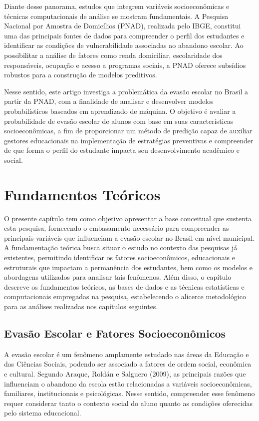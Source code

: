 \documentclass[english, spanish, brazilian]{RBIEarticle} %
\begin{document}
Diante desse panorama, estudos que integrem variáveis socioeconômicas e técnicas computacionais de análise se mostram fundamentais. A Pesquisa Nacional por Amostra de Domicílios (PNAD), realizada pelo IBGE, constitui uma das principais fontes de dados para compreender o perfil dos estudantes e identificar as condições de vulnerabilidade associadas ao abandono escolar. Ao possibilitar a análise de fatores como renda domiciliar, escolaridade dos responsáveis, ocupação e acesso a programas sociais, a PNAD oferece subsídios robustos para a construção de modelos preditivos.

Nesse sentido, este artigo investiga a problemática da evasão escolar no Brasil a partir da PNAD, com a finalidade de analisar e desenvolver modelos probabilísticos baseados em aprendizado de máquina. O objetivo é avaliar a probabilidade de evasão escolar de alunos com base em suas características socioeconômicas, a fim de proporcionar um método de predição capaz de auxiliar gestores educacionais na implementação de estratégias preventivas e compreender de que forma o perfil do estudante impacta seu desenvolvimento acadêmico e social.



\section{Fundamentos Teóricos}

O presente capítulo tem como objetivo apresentar a base conceitual que sustenta esta pesquisa, fornecendo o embasamento necessário para compreender as principais variáveis que influenciam a evasão escolar no Brasil em nível municipal. A fundamentação teórica busca situar o estudo no contexto das pesquisas já existentes, permitindo identificar os fatores socioeconômicos, educacionais e estruturais que impactam a permanência dos estudantes, bem como os modelos e abordagens utilizados para analisar tais fenômenos. Além disso, o capítulo descreve os fundamentos teóricos, as bases de dados e as técnicas estatísticas e computacionais empregadas na pesquisa, estabelecendo o alicerce metodológico para as análises realizadas nos capítulos seguintes.
\subsection{Evasão Escolar e Fatores Socioeconômicos}
A evasão escolar é um fenômeno amplamente estudado nas áreas da Educação e das Ciências Sociais, podendo ser associado a fatores de ordem social, econômica e cultural. Segundo Araque, Roldán e Salguero (2009), as principais razões que influenciam o abandono da escola estão relacionadas a variáveis socioeconômicas, familiares, institucionais e psicológicas. Nesse sentido, compreender esse fenômeno requer considerar tanto o contexto social do aluno quanto as condições oferecidas pelo sistema educacional.
\end{document}
